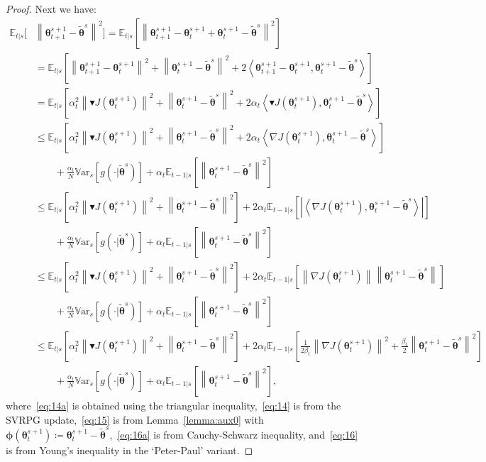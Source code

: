 \documentclass{article}
\theoremstyle{remark}
\theoremstyle{definition}
\newcommand{\norm}[2][\infty]{\left\|#2\right\|_{#1}}
\newcommand{\dotprod}[2]{\left\langle#1,#2\right\rangle}
\newcommand{\vtheta}{\boldsymbol{\theta}}
\newcommand{\vphi}{\boldsymbol{\phi}}
\newcommand{\gradJ}[1]{\nabla J(#1)}
\newcommand{\Ets}[2][t]{\mathbb{E}_{#1\vert s}\left[#2\right]}
\newcommand{\Vars}[1]{{\mathbb{V}\text{ar}}_{s}\left[#1\right]}
\newcommand{\gradBlack}[1]{\blacktriangledown J(#1)}
\newcommand{\wt}[1]{\widetilde{#1}}
\begin{document}
\begin{proof}
Next we have:
\begingroup
\allowdisplaybreaks
\begin{align}
        \mathbb{E}_{t|s}\bigg[ & \norm[]{\vtheta_{t+1}^{s+1}-\wt{\vtheta}^s}^2 \bigg]
= \Ets{\norm[]{\vtheta_{t+1}^{s+1}- \vtheta_t^{s+1} + \vtheta_t^{s+1}-\wt{\vtheta}^s}^2} \nonumber\\
&=\Ets{\norm[]{\vtheta_{t+1}^{s+1}-\vtheta_{t}^{s+1}}^2+\norm[]{\vtheta_t^{s+1}-\wt{\vtheta}^s}^2+2\dotprod{\vtheta_{t+1}^{s+1}-\vtheta_{t}^{s+1}}{\vtheta_t^{s+1}-\wt{\vtheta}^s}} \label{eq:14a} \\
&= \Ets{\alpha_t^2\norm[]{\gradBlack{\vtheta_t^{s+1}}}^2+\norm[]{\vtheta_t^{s+1}-\wt{\vtheta}^s}^2+2\alpha_t\dotprod{\gradBlack{\vtheta_t^{s+1}}}{\vtheta_t^{s+1}-\wt{\vtheta}^s}} \label{eq:14}\\
&\leq \Ets{\alpha_t^2\norm[]{\gradBlack{\vtheta_t^{s+1}}}^2+\norm[]{\vtheta_t^{s+1}-\wt{\vtheta}^s}^2+2\alpha_t\dotprod{\gradJ{\vtheta_t^{s+1}}}{\vtheta_t^{s+1}-\wt{\vtheta}^s}} \nonumber\\ 
&\qquad+
\frac{\alpha_t}{N}\Vars{g(\cdot\vert\wt{\vtheta}^s)} +\alpha_t\Ets[t-1]{\norm[]{\vtheta_t^{s+1}-\wt{\vtheta}^s}^2} \label{eq:15}\\
%
&\leq \Ets{\alpha_t^2\norm[]{\gradBlack{\vtheta_t^{s+1}}}^2+\norm[]{\vtheta_t^{s+1}-\wt{\vtheta}^s}^2}
+2\alpha_t\Ets[t-1]{\left|\dotprod{\gradJ{\vtheta_t^{s+1}}}{\vtheta_t^{s+1}-\wt{\vtheta}^s}\right|} \nonumber\\ 
&\qquad+
\frac{\alpha_t}{N}\Vars{g(\cdot\vert\wt{\vtheta}^s)} +\alpha_t\Ets[t-1]{\norm[]{\vtheta_t^{s+1}-\wt{\vtheta}^s}^2} \nonumber\\
%
&\leq \Ets{\alpha_t^2\norm[]{\gradBlack{\vtheta_t^{s+1}}}^2+\norm[]{\vtheta_t^{s+1}-\wt{\vtheta}^s}^2}
+2\alpha_t\Ets[t-1]{\norm[]{\gradJ{\vtheta_t^{s+1}}}\norm[]{\vtheta_t^{s+1}-\wt{\vtheta}^s}} \nonumber\\ 
&\qquad+
\frac{\alpha_t}{N}\Vars{g(\cdot\vert\wt{\vtheta}^s)} +\alpha_t\Ets[t-1]{\norm[]{\vtheta_t^{s+1}-\wt{\vtheta}^s}^2} \nonumber\\
%
&\leq \Ets{\alpha_t^2\norm[]{\gradBlack{\vtheta_t^{s+1}}}^2+\norm[]{\vtheta_t^{s+1}-\wt{\vtheta}^s}^2}
+2\alpha_t\Ets[t-1]{\frac{1}{2\beta_t}\norm[]{\gradJ{\vtheta_t^{s+1}}}^2+\frac{\beta_t}{2}\norm[]{\vtheta_t^{s+1}-\wt{\vtheta}^s}^2} \label{eq:16a}\\ 
&\qquad
+\frac{\alpha_t}{N}\Vars{g(\cdot\vert\wt{\vtheta}^s)} +\alpha_t\Ets[t-1]{\norm[]{\vtheta_t^{s+1}-\wt{\vtheta}^s}^2}, \label{eq:16}
\end{align}
\endgroup
where~\eqref{eq:14a} is obtained using the triangular inequality,~\eqref{eq:14} is from the SVRPG update,~\eqref{eq:15} is from Lemma~\ref{lemma:aux0} with $\vphi(\vtheta_t^{s+1})\coloneqq\vtheta_t^{s+1}-\tilde{\vtheta}^s$,~\eqref{eq:16a} is from Cauchy-Schwarz inequality, and~\eqref{eq:16} is from Young's inequality in the `Peter-Paul' variant.

\end{proof}
\end{document}
